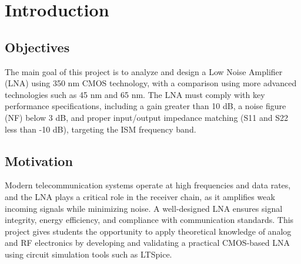 \section{Introduction}

\subsection{Objectives}

The main goal of this project is to analyze and design a Low Noise Amplifier (LNA) using 350 nm CMOS technology, with a comparison using more advanced technologies such as 45 nm and 65 nm. The LNA must comply with key performance specifications, including a gain greater than 10 dB, a noise figure (NF) below 3 dB, and proper input/output impedance matching (S11 and S22 less than -10 dB), targeting the ISM frequency band.

\subsection{Motivation}

Modern telecommunication systems operate at high frequencies and data rates, and the LNA plays a critical role in the receiver chain, as it amplifies weak incoming signals while minimizing noise. A well-designed LNA ensures signal integrity, energy efficiency, and compliance with communication standards. This project gives students the opportunity to apply theoretical knowledge of analog and RF electronics by developing and validating a practical CMOS-based LNA using circuit simulation tools such as LTSpice.